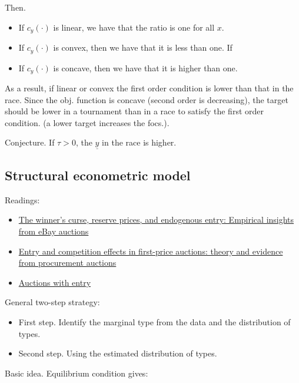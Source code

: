 \documentclass[11pt, titlepage]{article}
\newcommand\target{\underline{y}}
\begin{document}
Then.

\begin{itemize}
\item
  If \(c_y(\cdot)\) is linear, we have that the ratio is one for all
  \(x\).
\item
  If \(c_y(\cdot)\) is convex, then we have that it is less than one. If
\item
  If \(c_y(\cdot)\) is concave, then we have that it is higher than one.
\end{itemize}

As a result, if linear or convex the first order condition is lower than
that in the race. Since the obj. function is concave (second order is
decreasing), the target should be lower in a tournament than in a race
to satisfy the first order condition. (a lower target increases the
focs.).

Conjecture. If \(\tau>0\), the \(\target\) in the race is higher.

\subsection{Structural econometric
model}\label{structural-econometric-model}

Readings:

\begin{itemize}
\item
  \href{http://citeseerx.ist.psu.edu/viewdoc/download?doi=10.1.1.199.680\&rep=rep1\&type=pdf}{The
  winner's curse, reserve prices, and endogenous entry: Empirical
  insights from eBay auctions}
\item
  \href{https://www.econstor.eu/bitstream/10419/79263/1/516364804.pdf}{Entry
  and competition effects in first-price auctions: theory and evidence
  from procurement auctions}
\item
  \href{http://www.vita.mcafee.cc/PDF/AuctionswithEntry.pdf}{Auctions
  with entry}
\end{itemize}

General two-step strategy:

\begin{itemize}
\item
  First step. Identify the marginal type from the data and the
  distribution of types.
\item
  Second step. Using the estimated distribution of types.
\end{itemize}

Basic idea. Equilibrium condition gives:
\end{document}
